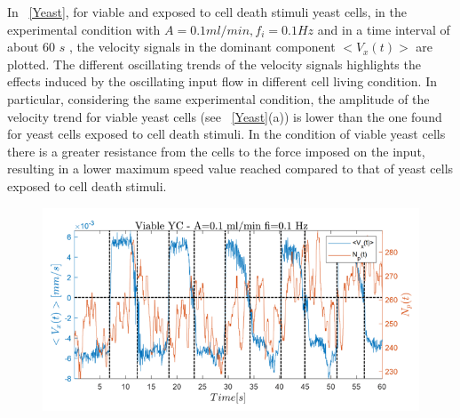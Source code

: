 \documentclass[journal]{IEEEtran}
\theoremstyle{definition}
\theoremstyle{remark}
\begin{document}
In ~\fig\ref{Yeast}, for viable and exposed to cell death stimuli yeast cells, in the experimental condition with {$A=0.1 ml/min, f_i= 0.1 Hz$} and in a time interval of about 60 $s$ , the velocity signals in the dominant component  $<V_x(t)>$  are plotted. The different oscillating trends of the velocity signals highlights the effects induced by the oscillating input flow in different cell living condition. In particular, considering the same experimental condition, the amplitude of the velocity trend for viable yeast cells (see ~\fig\ref{Yeast}(a)) is lower than the one found for yeast cells exposed to cell death stimuli. 
In the condition of viable yeast cells there is a greater resistance from the cells to the force imposed on the input, resulting in a lower maximum speed value reached compared to that of yeast cells exposed to cell death stimuli.

\begin{figure}[t]
	\centering
	\includegraphics[width=1\columnwidth]{images/VelPar}
\end{figure}
\end{document}
